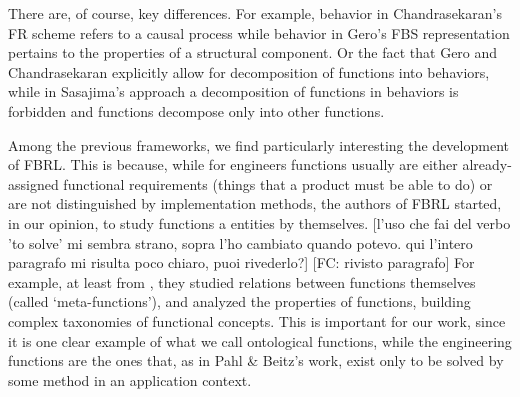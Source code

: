 \documentclass[sw]{iosart2x}
\newcommand{\quotes}[1]{`#1'}
\newcommand{\TODO}[1]{{\color{red} #1}}
\begin{document}
There are, of course, key differences. 
For example, behavior in Chandrasekaran’s FR scheme refers to a causal process while behavior in Gero’s FBS representation pertains to the properties of a structural component.
Or the fact that Gero and Chandrasekaran explicitly allow for decomposition of functions into behaviors, while in Sasajima's approach a decomposition of functions in behaviors is forbidden and functions decompose only into other functions.  

Among the previous frameworks, we find particularly interesting the development of FBRL. 
This is because, while for engineers functions usually are either already-assigned functional requirements (things that a product must be able to do) or are not distinguished by implementation methods, the authors of FBRL started, in our opinion, to study functions a entities by themselves.%
\TODO{[l'uso che fai del verbo 'to solve' mi sembra strano, sopra l'ho cambiato quando potevo. qui l'intero paragrafo mi risulta poco chiaro, puoi rivederlo?] [FC: rivisto paragrafo]}
For example, at least from \cite{kitamuraMetaFunctionsArtifacts1999}, they studied relations between functions themselves (called \quotes{meta-functions}), and analyzed the properties of functions, building complex taxonomies of functional concepts.
This is important for our work, since it is one
clear example of what we call ontological functions, while the engineering functions are the ones that, as in Pahl \& Beitz's work, exist only to be solved by some method %
in an application context.
\end{document}
